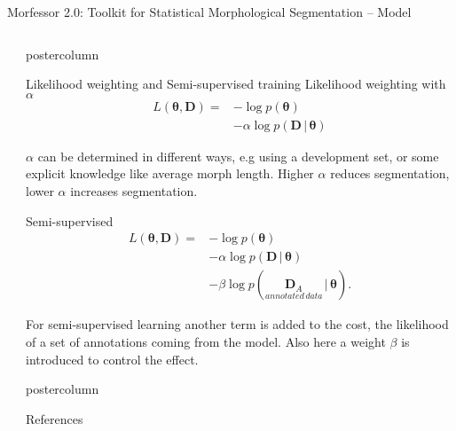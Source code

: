 \documentclass[final]{beamer} %
\newcommand{\seq}[1]{\boldsymbol{#1}}
\newcommand{\cost}{L}
\newcommand{\params}{\boldsymbol{\theta}}
\newcommand{\data}{\seq{D}}
\newcommand{\vb}{\,|\,}
\begin{document}
\begin{frame}{Morfessor 2.0: Toolkit for Statistical Morphological Segmentation -- Model}
\begin{columns}
\begin{column}{.4\textwidth}
\end{column}
\begin{column}{.3\textwidth}




      \begin{beamercolorbox}[center,wd=\textwidth]{postercolumn}
 \begin{block}{Likelihood weighting and Semi-supervised training }
Likelihood weighting with $\alpha$ \citep{virpioja2011nodalida}
\begin{align*}
  \cost(\params, \data) =& - \log p(\params) \\&- \alpha \log p(\data
  \vb \params)
\end{align*}

$\alpha$ can be determined in different ways, e.g using a development set, or some explicit knowledge like average morph length. Higher $\alpha$ reduces segmentation, lower $\alpha$ increases segmentation.

Semi-supervised \citep{kohonen2010sigmorphon}
\begin{align*}
  \cost(\params, \data) = & - \log p(\params) \\&- \alpha \log p(\data
  \vb \params) \\&- \beta \log p(\underset{annotated\,data}{\data_{A}} \vb \params).
\end{align*}

For semi-supervised learning another term is added to the cost, the likelihood of a set of annotations coming from the model. Also here a weight $\beta$ is introduced to control the effect.

            \end{block}
	\end{beamercolorbox}
\vfill
\vspace{0mm}
  \begin{beamercolorbox}[center,wd=\textwidth]{postercolumn}
 \begin{block}{References}
\footnotesize

           
            \end{block}
            
	\end{beamercolorbox}




\end{column}

\end{columns}
 \end{frame}



  
\end{document}
